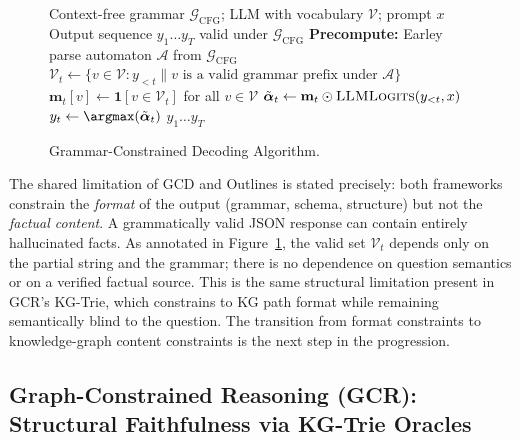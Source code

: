 \begin{figure}[H]
    \centering
    \begin{algorithm}[H]
        \caption{Grammar-Constrained Decoding Algorithm}
        \begin{algorithmic}[1]
            \Require Context-free grammar $\mathcal{G}_{\text{CFG}}$; LLM with vocabulary
            $\mathcal{V}$; prompt $x$
            \Ensure Output sequence $y_1 \ldots y_T$ valid under $\mathcal{G}_{\text{CFG}}$
            \State \textbf{Precompute:} Earley parse automaton $\mathcal{A}$ from
            $\mathcal{G}_{\text{CFG}}$
            \State $\mathcal{V}_t \gets \{v \in \mathcal{V} : y_{<t} \| v \text{ is a valid
                    grammar prefix under } \mathcal{A}\}$
            \State $\mathbf{m}_t[v] \gets \mathbf{1}[v \in \mathcal{V}_t]$ for all
            $v \in \mathcal{V}$
            \State $\tilde{\boldsymbol{\alpha}}_t \gets \mathbf{m}_t \odot
                \textsc{LLMLogits}(y_{<t}, x)$
            \State $y_t \gets \argmax(\tilde{\boldsymbol{\alpha}}_t)$
            \EndFor
            \State \Return $y_1 \ldots y_T$
        \end{algorithmic}
    \end{algorithm}
    \caption{Grammar-Constrained Decoding Algorithm.}
    \label{alg:gcd}
\end{figure}

The shared limitation of GCD and Outlines is stated precisely: both frameworks
constrain the \textit{format} of the output (grammar, schema, structure) but not
the \textit{factual content}. A grammatically valid JSON response can contain
entirely hallucinated facts. As annotated in Figure~\ref{alg:gcd}, the valid
set $\mathcal{V}_t$ depends only on the partial string and the grammar; there is
no dependence on question semantics or on a verified factual source. This is the
same structural limitation present in GCR's KG-Trie, which constrains to KG
path format while remaining semantically blind to the question. The transition
from format constraints to knowledge-graph content constraints is the next step
in the progression.

\subsection{Graph-Constrained Reasoning (GCR): Structural Faithfulness via KG-Trie Oracles}

